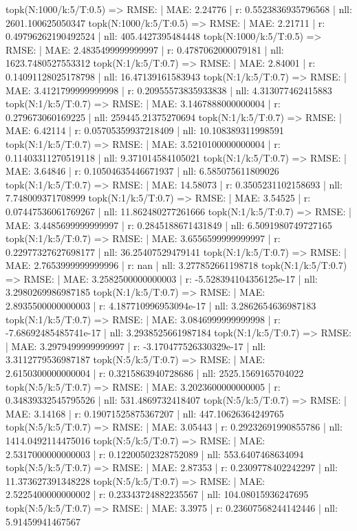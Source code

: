 topk(N:1000/k:5/T:0.5) => RMSE: | MAE: 2.24776 | r: 0.5523836935796568 | nll: 2601.100625050347
topk(N:1000/k:5/T:0.5) => RMSE: | MAE: 2.21711 | r: 0.49796262190492524 | nll: 405.4427395484448
topk(N:1000/k:5/T:0.5) => RMSE: | MAE: 2.4835499999999997 | r: 0.4787062000079181 | nll: 1623.7480527553312
topk(N:1/k:5/T:0.7) => RMSE: | MAE: 2.84001 | r: 0.14091128025178798 | nll: 16.47139161583943
topk(N:1/k:5/T:0.7) => RMSE: | MAE: 3.4121799999999998 | r: 0.20955573835933838 | nll: 4.313077462415883
topk(N:1/k:5/T:0.7) => RMSE: | MAE: 3.1467888000000004 | r: 0.279673060169225 | nll: 259445.21375270694
topk(N:1/k:5/T:0.7) => RMSE: | MAE: 6.42114 | r: 0.05705359937218409 | nll: 10.108389311998591
topk(N:1/k:5/T:0.7) => RMSE: | MAE: 3.5210100000000004 | r: 0.11403311270519118 | nll: 9.371014584105021
topk(N:1/k:5/T:0.7) => RMSE: | MAE: 3.64846 | r: 0.10504635446671937 | nll: 6.585075611809026
topk(N:1/k:5/T:0.7) => RMSE: | MAE: 14.58073 | r: 0.3505231102158693 | nll: 7.748009371708999
topk(N:1/k:5/T:0.7) => RMSE: | MAE: 3.54525 | r: 0.07447536061769267 | nll: 11.862480277261666
topk(N:1/k:5/T:0.7) => RMSE: | MAE: 3.4485699999999997 | r: 0.2845188671431849 | nll: 6.5091980749727165
topk(N:1/k:5/T:0.7) => RMSE: | MAE: 3.6556599999999997 | r: 0.22977327627698177 | nll: 36.25407529479141
topk(N:1/k:5/T:0.7) => RMSE: | MAE: 2.7653999999999996 | r: nan | nll: 3.277852661198718
topk(N:1/k:5/T:0.7) => RMSE: | MAE: 3.2582500000000003 | r: -5.528394104356125e-17 | nll: 3.2980269986987185
topk(N:1/k:5/T:0.7) => RMSE: | MAE: 2.8935500000000003 | r: 4.187710996953094e-17 | nll: 3.2862654636987183
topk(N:1/k:5/T:0.7) => RMSE: | MAE: 3.0846999999999998 | r: -7.68692485485741e-17 | nll: 3.2938525661987184
topk(N:1/k:5/T:0.7) => RMSE: | MAE: 3.2979499999999997 | r: -3.170477526330329e-17 | nll: 3.3112779536987187
topk(N:5/k:5/T:0.7) => RMSE: | MAE: 2.6150300000000004 | r: 0.3215863940728686 | nll: 2525.1569165704022
topk(N:5/k:5/T:0.7) => RMSE: | MAE: 3.2023600000000005 | r: 0.34839332545795526 | nll: 531.4869732418407
topk(N:5/k:5/T:0.7) => RMSE: | MAE: 3.14168 | r: 0.19071525875367207 | nll: 447.10626364249765
topk(N:5/k:5/T:0.7) => RMSE: | MAE: 3.05443 | r: 0.29232691990855786 | nll: 1414.0492114475016
topk(N:5/k:5/T:0.7) => RMSE: | MAE: 2.5317000000000003 | r: 0.12200502328752089 | nll: 553.6407468634094
topk(N:5/k:5/T:0.7) => RMSE: | MAE: 2.87353 | r: 0.2309778402242297 | nll: 11.373627391348228
topk(N:5/k:5/T:0.7) => RMSE: | MAE: 2.5225400000000002 | r: 0.23343724882235567 | nll: 104.08015936247695
topk(N:5/k:5/T:0.7) => RMSE: | MAE: 3.3975 | r: 0.23607568244142446 | nll: 5.91459941467567
